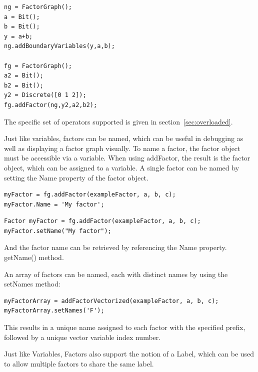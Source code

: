 \begin{lstlisting}
ng = FactorGraph();
a = Bit();
b = Bit();
y = a+b;
ng.addBoundaryVariables(y,a,b);

fg = FactorGraph();
a2 = Bit();
b2 = Bit();
y2 = Discrete([0 1 2]);
fg.addFactor(ng,y2,a2,b2);
\end{lstlisting}

The specific set of operators supported is given in section~\ref{sec:overloaded}.

\fi



Just like variables, factors can be named, which can be useful in debugging as well as displaying a factor graph visually.  To name a factor, the factor object must be accessible via a variable.  When using addFactor, the result is the factor object, which can be assigned to a variable.  A single factor can be named by setting the Name property of the factor object.

\ifmatlab

\begin{lstlisting}
myFactor = fg.addFactor(exampleFactor, a, b, c);
myFactor.Name = 'My factor';
\end{lstlisting}

\fi

\ifjava
\begin{lstlisting}
Factor myFactor = fg.addFactor(exampleFactor, a, b, c);
myFactor.setName("My factor");
\end{lstlisting}

\fi

And the factor name can be retrieved by referencing the \ifmatlab Name property. \fi \ifjava getName() method. \fi

\ifmatlab

An array of factors can be named, each with distinct names by using the setNames method:

\begin{lstlisting}
myFactorArray = addFactorVectorized(exampleFactor, a, b, c);
myFactorArray.setNames('F');
\end{lstlisting}

This results in a unique name assigned to each factor with the specified prefix, followed by a unique vector variable index number.

\fi

Just like Variables, Factors also support the notion of a Label, which can be used to allow multiple factors to share the same label.

